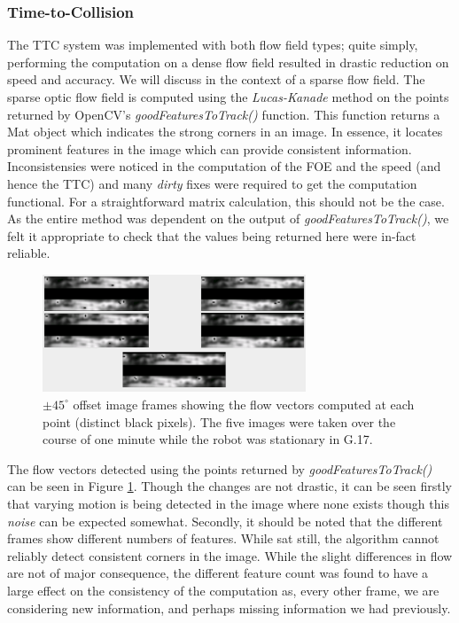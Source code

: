 \documentclass[a4paper,12pt]{article}
\begin{document}
\subsubsection{Time-to-Collision}
The TTC system was implemented with both flow field types; quite simply, performing the computation on a dense flow
field resulted in drastic reduction on speed and accuracy. We will discuss in the context of a sparse flow field. The
sparse optic flow field is computed using the \textit{Lucas-Kanade} method on the points returned by OpenCV's
\textit{goodFeaturesToTrack()} function. This function returns a Mat object which indicates the strong corners in an image.
In essence, it locates prominent features in the image which can provide consistent information. Inconsistensies
were noticed in the computation of the FOE and the speed (and hence the TTC) and many \textit{dirty} fixes were required to get the computation
functional. For a straightforward matrix calculation, this should not be the case. As the entire method was dependent on
the output of \textit{goodFeaturesToTrack()}, we felt it appropriate to check that the values being returned here were in-fact
reliable.

\begin{figure}
  \centering
  \includegraphics[width=0.7\textwidth]{OpticalFlowInconsistencies}
  \caption{
    \label{fig:ofbad} $\pm 45^{\circ}$ offset image frames showing the flow vectors computed at each point (distinct black
    pixels). The five images were taken over the course of one minute while the robot was stationary in G.17.
  }
\end{figure}

The flow vectors detected using the points returned by \textit{goodFeaturesToTrack()} can be seen in Figure \ref{fig:ofbad}.
Though the changes are not drastic, it can be seen firstly that varying motion is being detected in the image where none
exists though this \textit{noise} can be expected somewhat. Secondly, it should be noted that the different frames show different numbers
of features. While sat still, the algorithm cannot reliably detect consistent corners in the image. While the slight
differences in flow are not of major consequence, the different feature count was found to have a large effect
on the consistency of the computation as, every other frame, we are considering new information, and perhaps missing information
we had previously.
\newline
\end{document}
